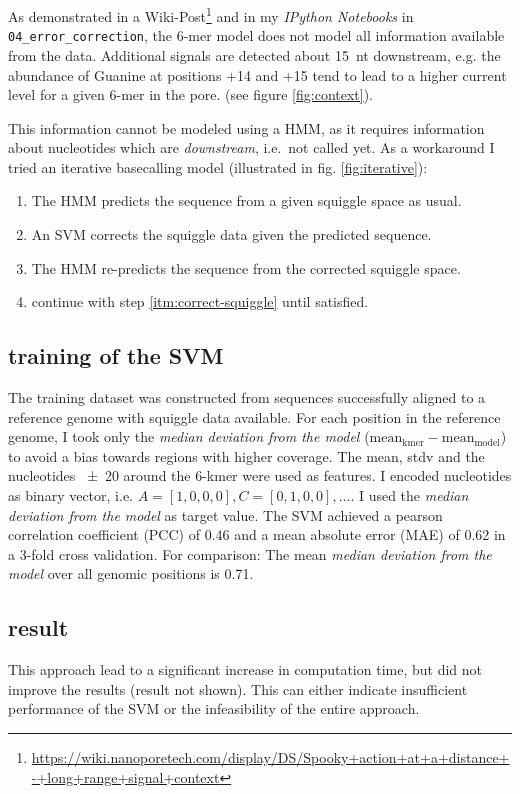 \documentclass[]{scrartcl}
\begin{document}
As demonstrated in a Wiki-Post\footnote{\url{https://wiki.nanoporetech.com/display/DS/Spooky+action+at+a+distance+-+long+range+signal+context}} and in my \textit{IPython Notebooks} in \texttt{04\_error\_correction}, the 6-mer model does not model all information available from the data. Additional signals are detected about \SI{15}{nt} downstream, e.g. the abundance of Guanine at positions +14 and +15 tend to lead to a higher current level for a given 6-mer in the pore. (see figure \ref{fig:context}).

This information cannot be modeled using a HMM, as it requires information about nucleotides which are \textit{downstream}, i.e.\ not called yet. As a workaround I tried an iterative basecalling model (illustrated in fig. \ref{fig:iterative}): 

\begin{enumerate}
\item The HMM predicts the sequence from a given squiggle space as usual.
\item An SVM corrects the squiggle data given the predicted sequence. \label{itm:correct-squiggle}
\item The HMM re-predicts the sequence from the corrected squiggle space. 
\item continue with step \ref{itm:correct-squiggle} until satisfied. 
\end{enumerate}

\subsection{training of the SVM}
The training dataset was constructed from sequences successfully aligned to a reference genome with squiggle data available. For each position in the reference genome, I took only the \textit{median deviation from the model} ($\mathrm{mean}_\mathrm{kmer} - \mathrm{mean}_\mathrm{model}$) to avoid a bias towards regions with higher coverage. The mean, stdv and the nucleotides \num{+-20} around the 6-kmer were used as features. I encoded nucleotides as binary vector, i.e. $A=[1, 0, 0, 0], C=[0, 1, 0, 0], \dots$. I used the \textit{median deviation from the model} as target value. The SVM achieved a pearson correlation coefficient (PCC) of 0.46 and a mean absolute error (MAE) of 0.62 in a 3-fold cross validation. For comparison: The mean \textit{median deviation from the model} over all genomic positions is 0.71. 

\subsection{result}
This approach lead to a significant increase in computation time, but did not improve the results (result not shown). This can either indicate insufficient performance of the SVM or the infeasibility of the entire approach. 
\end{document}
